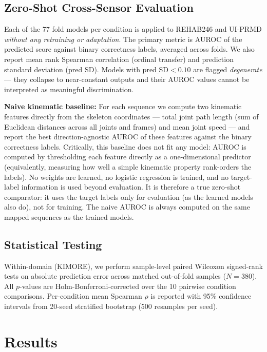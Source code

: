 \documentclass[10pt,journal]{IEEEtran}
\begin{document}
\subsection{Zero-Shot Cross-Sensor Evaluation}
\label{sec:zeroshot}

Each of the 77 fold models per condition is applied to REHAB246 and UI-PRMD \emph{without any retraining or adaptation}. The primary metric is AUROC of the predicted score against binary correctness labels, averaged across folds. We also report mean rank Spearman correlation (ordinal transfer) and prediction standard deviation ($\text{pred\_SD}$). Models with $\text{pred\_SD} < 0.10$ are flagged \emph{degenerate} --- they collapse to near-constant outputs and their AUROC values cannot be interpreted as meaningful discrimination.

\textbf{Naive kinematic baseline:} For each sequence we compute two kinematic features directly from the skeleton coordinates --- total joint path length (sum of Euclidean distances across all joints and frames) and mean joint speed --- and report the best direction-agnostic AUROC of these features against the binary correctness labels. Critically, this baseline does not fit any model: AUROC is computed by thresholding each feature directly as a one-dimensional predictor (equivalently, measuring how well a simple kinematic property rank-orders the labels). No weights are learned, no logistic regression is trained, and no target-label information is used beyond evaluation. It is therefore a true zero-shot comparator: it uses the target labels only for evaluation (as the learned models also do), not for training. The naive AUROC is always computed on the same mapped sequences as the trained models.

\subsection{Statistical Testing}
\label{sec:stats}

Within-domain (KIMORE), we perform sample-level paired Wilcoxon signed-rank tests on absolute prediction error across matched out-of-fold samples ($N=380$). All $p$-values are Holm-Bonferroni-corrected over the 10 pairwise condition comparisons. Per-condition mean Spearman $\rho$ is reported with 95\% confidence intervals from 20-seed stratified bootstrap (500 resamples per seed).

\section{Results}
\label{sec:results}
\end{document}
